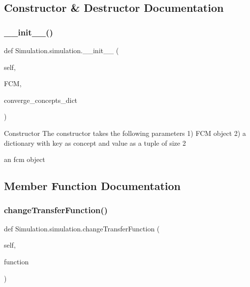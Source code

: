 \subsection{Constructor \& Destructor Documentation}
\hypertarget{class_simulation_1_1simulation_a0f0377da7ec6ea298232042744c03e89}{}\label{class_simulation_1_1simulation_a0f0377da7ec6ea298232042744c03e89} 
\subsubsection{\texorpdfstring{\+\_\+\+\_\+init\+\_\+\+\_\+()}{\_\_init\_\_()}}
{\footnotesize\ttfamily def Simulation.\+simulation.\+\_\+\+\_\+init\+\_\+\+\_\+ (\begin{DoxyParamCaption}\item[{}]{self,  }\item[{}]{F\+CM,  }\item[{}]{converge\+\_\+concepts\+\_\+dict }\end{DoxyParamCaption})}

\begin{DoxyVerb}Constructor
The constructor takes the following parameters
1) FCM object
2) a dictionary with key as concept and value as a tuple of size 2
\end{DoxyVerb}
\begin{DoxyVerb}an fcm object \end{DoxyVerb}
 

\subsection{Member Function Documentation}
\hypertarget{class_simulation_1_1simulation_a6de2037ab28f1fd076cadeb95f1e83fa}{}\label{class_simulation_1_1simulation_a6de2037ab28f1fd076cadeb95f1e83fa} 
\subsubsection{\texorpdfstring{change\+Transfer\+Function()}{changeTransferFunction()}}
{\footnotesize\ttfamily def Simulation.\+simulation.\+change\+Transfer\+Function (\begin{DoxyParamCaption}\item[{}]{self,  }\item[{}]{function }\end{DoxyParamCaption})}

